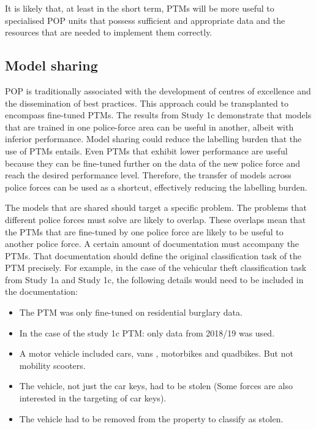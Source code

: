 It is likely that, at least in the short term, PTMs will be more useful to specialised POP units that possess sufficient and appropriate data and the resources that are needed to implement them correctly.

\subsection{Model sharing} POP is traditionally associated with the development of centres of excellence and the dissemination of best practices. This approach could be transplanted to encompass fine-tuned PTMs. The results from Study 1c demonstrate that models that are trained in one police-force area can be useful in another, albeit with inferior performance. Model sharing could reduce the labelling burden that the use of PTMs entails. Even PTMs that exhibit lower performance are useful because they can be fine-tuned further on the data of the new police force and reach the desired performance level. Therefore, the transfer of models across police forces can be used as a shortcut, effectively reducing the labelling burden.

The models that are shared should target a specific problem. The problems that different police forces must solve are likely to overlap. These overlaps mean that the PTMs that are fine-tuned by one police force are likely to be useful to another police force. A certain amount of documentation must accompany the PTMs. That documentation should define the original classification task of the PTM precisely. For example, in the case of the vehicular theft classification task from Study 1a and Study 1c, the following details would need to be included in the documentation:


\begin{itemize}

\item The PTM was only fine-tuned on residential burglary data.

\item In the case of the study 1c PTM: only data from 2018/19 was used.

\item A motor vehicle included cars, vans , motorbikes and quadbikes. But not mobility scooters.

\item The vehicle, not just the car keys, had to be stolen (Some forces are also interested in the targeting of car keys).

\item The vehicle had to be removed from the property to classify as stolen.

\end{itemize}

